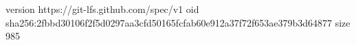 version https://git-lfs.github.com/spec/v1
oid sha256:2fbbd30106f2f5d0297aa3cfd50165fcfab60e912a37f72f653ae379b3d64877
size 985
